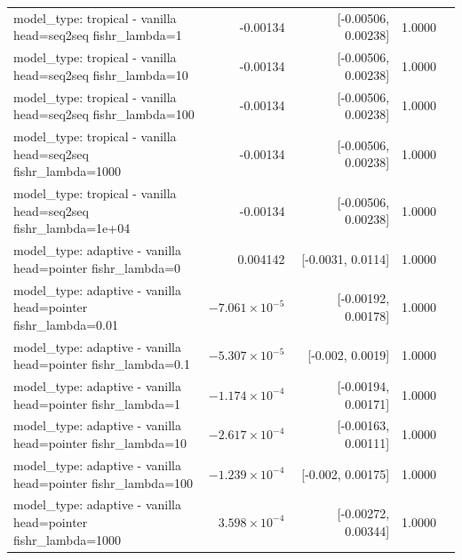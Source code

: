 \documentclass[10pt]{article}
\makeatletter
\newcommand{\stackcell}[1]{\begin{tabular}[t]{@{}l@{}}#1\end{tabular}}
\makeatother
\begin{document}
{\begin{longtable}{lrrrl}
\stackcell{model\_type: tropical - vanilla\\\footnotesize head=seq2seq fishr\_lambda=1 } & -0.00134 & [-0.00506, 0.00238] & 1.0000 & \\
\stackcell{model\_type: tropical - vanilla\\\footnotesize head=seq2seq fishr\_lambda=10 } & -0.00134 & [-0.00506, 0.00238] & 1.0000 & \\
\stackcell{model\_type: tropical - vanilla\\\footnotesize head=seq2seq fishr\_lambda=100 } & -0.00134 & [-0.00506, 0.00238] & 1.0000 & \\
\stackcell{model\_type: tropical - vanilla\\\footnotesize head=seq2seq fishr\_lambda=1000 } & -0.00134 & [-0.00506, 0.00238] & 1.0000 & \\
\stackcell{model\_type: tropical - vanilla\\\footnotesize head=seq2seq fishr\_lambda=1e+04 } & -0.00134 & [-0.00506, 0.00238] & 1.0000 & \\
\stackcell{model\_type: adaptive - vanilla\\\footnotesize head=pointer fishr\_lambda=0 } & 0.004142 & [-0.0031, 0.0114] & 1.0000 & \\
\stackcell{model\_type: adaptive - vanilla\\\footnotesize head=pointer fishr\_lambda=0.01 } & $-7.061\times10^{-5}$ & [-0.00192, 0.00178] & 1.0000 & \\
\stackcell{model\_type: adaptive - vanilla\\\footnotesize head=pointer fishr\_lambda=0.1 } & $-5.307\times10^{-5}$ & [-0.002, 0.0019] & 1.0000 & \\
\stackcell{model\_type: adaptive - vanilla\\\footnotesize head=pointer fishr\_lambda=1 } & $-1.174\times10^{-4}$ & [-0.00194, 0.00171] & 1.0000 & \\
\stackcell{model\_type: adaptive - vanilla\\\footnotesize head=pointer fishr\_lambda=10 } & $-2.617\times10^{-4}$ & [-0.00163, 0.00111] & 1.0000 & \\
\stackcell{model\_type: adaptive - vanilla\\\footnotesize head=pointer fishr\_lambda=100 } & $-1.239\times10^{-4}$ & [-0.002, 0.00175] & 1.0000 & \\
\stackcell{model\_type: adaptive - vanilla\\\footnotesize head=pointer fishr\_lambda=1000 } & $3.598\times10^{-4}$ & [-0.00272, 0.00344] & 1.0000 & \\

\end{longtable}}
\end{document}
